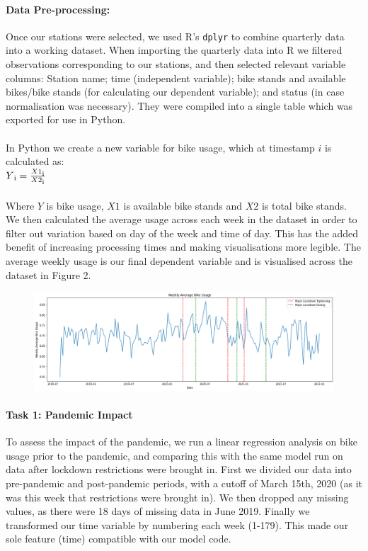 \documentclass[11pt,letterpaper]{article}
\begin{document}
\paragraph{Data Pre-processing:}
	Once our stations were selected, we used R’s \texttt{dplyr} to combine quarterly data into a working dataset. When importing the quarterly data into R we filtered observations corresponding to our stations, and then selected relevant variable columns: Station name; time (independent variable); bike stands and available bikes/bike stands (for calculating our dependent variable); and status (in case normalisation was necessary). They were compiled into a single table which was exported for use in Python.
\paragraph{}
	In Python we create a new variable for bike usage, which at timestamp $i$ is calculated as:\\
	$Y\textsubscript{i} = \frac{X1\textsubscript{i}}{X2\textsubscript{i}}$
\paragraph{}
	Where $Y$ is bike usage, $X1$ is available bike stands and $X2$ is total bike stands. We then calculated the average usage across each week in the dataset in order to filter out variation based on day of the week and time of day. This has the added benefit of increasing processing times and making visualisations more legible. The average weekly usage is our final dependent variable and is visualised across the dataset in Figure 2.
\begin{figure}[h]
	\centering
	\includegraphics[width=\textwidth]{timeseries.png}
\end{figure}
	
\paragraph{Task 1: Pandemic Impact}
	To assess the impact of the pandemic, we run a linear regression analysis on bike usage prior to the pandemic, and comparing this with the same model run on data after lockdown restrictions were brought in. First we divided our data into pre-pandemic and post-pandemic periods, with a cutoff of March 15th, 2020 (as it was this week that restrictions were brought in). We then dropped any missing values, as there were 18 days of missing data in June 2019. Finally we transformed our time variable by numbering each week (1-179). This made our sole feature (time) compatible with our model code.
\end{document}
